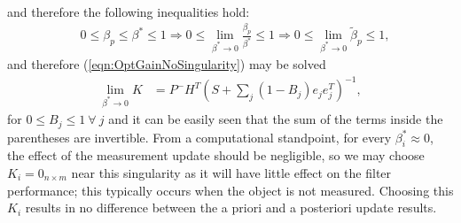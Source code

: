 \documentclass[letterpaper, 10pt, conference]{ieeeconf}
\newcommand{\refeqn}[1]{(\ref{eqn:#1})}
\begin{document}
\begin{appendix}
\begin{align}
\end{align}
and therefore the following inequalities hold:
\begin{align}
&0\leq\beta_p\leq\beta^*\leq1\Rightarrow0\leq\lim_{\beta^* \to 0}\frac{\beta_p}{\beta^*}\leq1\Rightarrow0\leq\lim_{\beta^* \to 0}\tilde\beta_p\leq1,
\end{align}
and therefore \refeqn{OptGainNoSingularity} may be solved
\begin{align}
\lim_{\beta^* \to 0}K
&=P^-H^T
(S+\sum\limits_{j}(1-B_j)e_{j}e_{j}^T)^{-1},
\label{eqn:OptGainNoSingularitySolved}
\end{align}
for $0\leq B_j\leq1\ \forall\ j$ and it can be easily seen that the sum of the terms inside the parentheses are invertible.
From a computational standpoint, for every $\beta^*_i\approx0$, the effect of the measurement update should be negligible, so we may choose $K_i=0_{n\times m}$ near this singularity as it will have little effect on the filter performance; this typically occurs when the object is not measured.
 Choosing this $K_i$ results in no difference between the a priori and a posteriori update results. 


\end{appendix}
\end{document}
